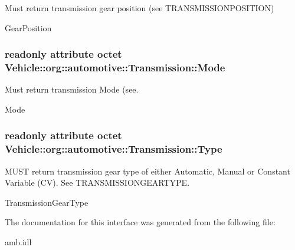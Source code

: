 Must return transmission gear position (see T\-R\-A\-N\-S\-M\-I\-S\-S\-I\-O\-N\-P\-O\-S\-I\-T\-I\-O\-N) 

Gear\-Position \hypertarget{interfaceVehicle_1_1org_1_1automotive_1_1Transmission_a31b7f50d2c48f916d82df0699d1cf2b2}{
\subsubsection[{Mode}]{\setlength{\rightskip}{0pt plus 5cm}readonly attribute octet Vehicle\-::org\-::automotive\-::\-Transmission\-::\-Mode}}\label{interfaceVehicle_1_1org_1_1automotive_1_1Transmission_a31b7f50d2c48f916d82df0699d1cf2b2}


Must return transmission Mode (see. 

Mode \hypertarget{interfaceVehicle_1_1org_1_1automotive_1_1Transmission_a56c8d4074ca7dfc581c0ce78a1ebd11a}{
\subsubsection[{Type}]{\setlength{\rightskip}{0pt plus 5cm}readonly attribute octet Vehicle\-::org\-::automotive\-::\-Transmission\-::\-Type}}\label{interfaceVehicle_1_1org_1_1automotive_1_1Transmission_a56c8d4074ca7dfc581c0ce78a1ebd11a}


M\-U\-S\-T return transmission gear type of either Automatic, Manual or Constant Variable (C\-V). See T\-R\-A\-N\-S\-M\-I\-S\-S\-I\-O\-N\-G\-E\-A\-R\-T\-Y\-P\-E. 

Transmission\-Gear\-Type 

The documentation for this interface was generated from the following file\-:\begin{DoxyCompactItemize}
\item 
amb.\-idl\end{DoxyCompactItemize}
